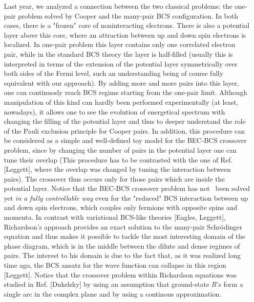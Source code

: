 \documentclass[aps,prb,superscriptaddress,twocolumn]{revtex4}
\begin{document}
Last year, we analyzed a connection between the two classical problems: the
one-pair problem solved by Cooper and the many-pair BCS configuration. In
both cases, there is a "frozen" core of noninteracting electrons. There is
also a potential layer above this core, where an attraction between up and
down spin electrons is localized. In one-pair problem this layer contains
only one correlated electron pair, while in the standard BCS theory the
layer is half-filled (usually this is interpreted in terms of the extension
of the potential layer symmetrically over both sides of the Fermi level,
such an understanding being of course fully equivalent with our approach).
By adding more and more pairs into this layer, one can continuosly reach BCS
regime starting from the one-pair limit. Although manipulation of this kind
can hardly been performed experimentally (at least, nowadays), it allows one
to see the evolution of energetical spectrum with changing the filling of
the potential layer and thus to deeper understand the role of the Pauli
exclusion principle for Cooper pairs. In addition, this procedure can be
considered as a simple and well-defined toy model for the BEC-BCS crossover
problem, since by changing the number of pairs in the potential layer one
can tune their overlap (This procedure has to be contrasted with the one of
Ref. [Leggett], where the overlap was changed by tuning the interaction
between pairs). The crossover thus occurs only for those pairs which are
inside the potential layer. Notice that the BEC-BCS crossover problem has
not \ been solved yet \textit{in a fully controllable way} even for the
"reduced" BCS interaction between up and down spin electrons, which couples
only fermions with opposite spins and momenta. In contrast with variational
BCS-like theories [Eagles, Leggett], Richardson's approach provides an exact
solution to the many-pair Schr\"{o}dinger equation and thus makes it
possible to tackle the most interesting domain of the phase diagram, which
is in the middle between the dilute and dense regimes of pairs. The interest
to his domain is due to the fact that, as it was realized long time ago, the
BCS ansatz for the wave function can collapse in this region [Leggett].
Notice that the crossover problem within Richardson equations was studied in
Ref. [Dukelsky] by using an assumption that ground-state $R$'s form a single
arc in the complex plane and by using a continous approximation.
\end{document}
